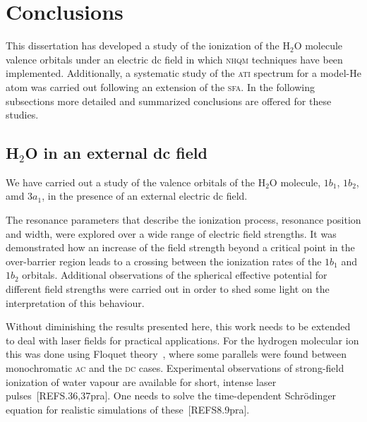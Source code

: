 \chapter{Conclusions}
\label{ch:conclusions}

This dissertation has developed a study of the ionization of the
H$_{2}$O molecule valence orbitals under an electric dc field in which
\textsc{nhqm} techniques have been implemented. Additionally, a
systematic study of the \textsc{ati} spectrum for a model-He atom was
carried out following an extension of the \textsc{sfa}. In the
following subsections more detailed and summarized conclusions are
offered for these studies.

\section{H$_{2}$O in an external dc field}
\label{ch:h2o_results}

We have carried out a study of the valence orbitals of the H$_{2}$O
molecule, $1b_{1}$, $1b_{2}$, amd $3a_{1}$, in the presence of an
external electric dc field.



The resonance parameters that describe the ionization process,
resonance position and width, were explored over a wide range of
electric field strengths. It was demonstrated how an increase of the
field strength beyond a critical point in the over-barrier region
leads to a crossing between the ionization rates of the $1b_{1}$ and
$1b_{2}$ orbitals. Additional observations of the spherical effective
potential for different field strengths were carried out in order to
shed some light on the interpretation of this behaviour.



Without diminishing the results presented here, this work needs to be
extended to deal with laser fields for practical applications. For the
hydrogen molecular ion this was done using Floquet
theory~\cite{Tsog_H2mol_ac_2013}, where some parallels were found
between monochromatic \textsc{ac} and the \textsc{dc}
cases. Experimental observations of strong-field ionization of water
vapour are available for short, intense laser
pulses~[REFS.36,37pra]. One needs to solve the time-dependent
Schr\"{o}dinger equation for realistic simulations of
these~[REFS8.9pra].




